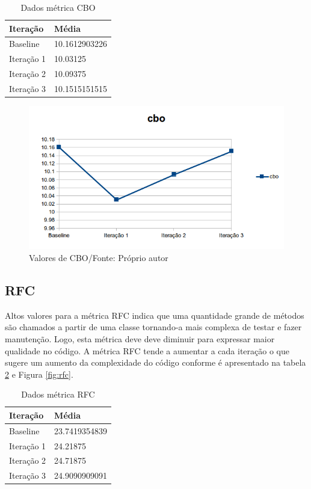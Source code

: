 \begin{table}[h]
	\centering
	    \caption{Dados métrica CBO}
	
    \begin{tabular}{ | l | l | }
    \hline
    Iteração & Média 			\\ \hline
    Baseline & 10.1612903226   	\\ \hline
    Iteração 1 & 10.03125		\\ \hline
	Iteração 2 & 10.09375		\\ \hline
	Iteração 3 & 10.1515151515	\\ \hline
    \end{tabular}
    \label{tab:cbo}
\end{table}

\begin{figure}[h]
	\centering
	\includegraphics{img/cbo.png}
	\caption{Valores de CBO/Fonte: Próprio autor}
	\label{fig:cbo}
\end{figure}


\subsection{RFC}

Altos valores para a métrica RFC indica que uma quantidade grande de métodos são
chamados a partir de uma classe tornando-a mais complexa de testar e fazer
manutenção. Logo, esta métrica deve deve diminuir para expressar maior
qualidade no código. A métrica RFC tende a aumentar a cada iteração o que sugere
um aumento da complexidade do código conforme é apresentado na tabela \ref{tab:rfc} e Figura
\ref{fig:rfc}.

\begin{table}[h]
	\centering
	    \caption{Dados métrica RFC}
    \begin{tabular}{ | l | l | }
    \hline
    Iteração & Média 			\\ \hline
    Baseline & 23.7419354839   	\\ \hline
    Iteração 1 & 24.21875		\\ \hline
	Iteração 2 & 24.71875		\\ \hline
	Iteração 3 & 24.9090909091	\\ \hline
    \end{tabular}
    \label{tab:rfc}
\end{table}

